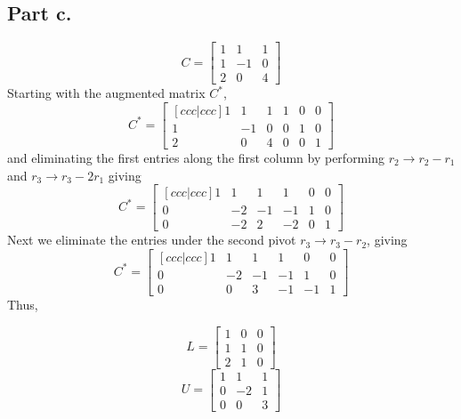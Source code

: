 \subsection{Part c.}
\begin{equation}
    C = 
    \begin{bmatrix}
        1   &   1   &   1   \\
        1   &   -1  &   0   \\
        2   &   0   &   4
    \end{bmatrix}
\end{equation}
Starting with the augmented matrix $C^{\ast}$,
\begin{equation}
    C^{\ast} =
    \begin{bmatrix}[ccc|ccc]
        1   &   1   &   1   &   1   &  0   &   0   \\
        1   &   -1  &   0   &   0   &  1   &   0   \\
        2   &   0   &   4   &   0   &  0   &   1
    \end{bmatrix}
\end{equation}
and eliminating the first entries along the first column by performing
$r_{2} \rightarrow r_{2} - r_{1}$ and $r_{3}\rightarrow r_{3} -2 r_{1}$
giving
\begin{equation}
    C^{\ast} =
    \begin{bmatrix}[ccc|ccc]
        1   &   1   &   1   &   1   &  0   &   0   \\
        0   &   -2  &   -1  &   -1  &  1   &   0   \\
        0   &   -2   &   2  &   -2  &  0   &   1
    \end{bmatrix}
\end{equation}
Next we eliminate the entries under the second pivot $r_{3} \rightarrow r_{3}
- r_{2}$, giving
\begin{equation}
    C^{\ast} =
    \begin{bmatrix}[ccc|ccc]
        1   &   1   &   1   &   1   &  0   &   0   \\
        0   &   -2  &   -1  &   -1  &  1   &   0   \\
        0   &   0   &   3   &   -1  &  -1  &   1
    \end{bmatrix}
\end{equation}
Thus, 
\begin{mdframed}[style=MyFrame]
    \begin{equation}
        L =
        \begin{bmatrix}
            1       &   0   &   0   \\
            1       &   1   &   0   \\
            2       &   1   &   0
        \end{bmatrix}
    \end{equation}
    \begin{equation}
        U =
        \begin{bmatrix}
            1       &   1   &   1   \\
            0       &   -2  &   1   \\
            0       &   0   &   3
        \end{bmatrix}
    \end{equation}
\end{mdframed}
